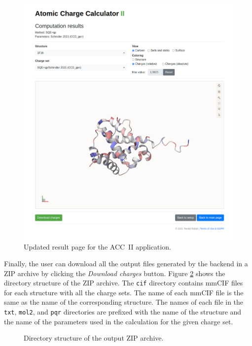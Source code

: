 \documentclass[
  digital,     %
  oneside,     %
  nosansbold,  %
  nocolorbold, %
  lof,         %
  lot,         %
]{fithesis4}
\begin{document}
\begin{figure}[htbp]
  \begin{center}
    \includegraphics[width=\textwidth]{figures/results-full.png}
  \end{center}
  \caption{Updated result page for the ACC~II application.}
  \label{fig:result_page}
\end{figure}

Finally, the user can download all the output files generated by the backend in a ZIP archive by clicking the \textit{Download charges} button. Figure \ref{fig:output_dir_structure} shows the directory structure of the ZIP archive. The \texttt{cif} directory contains mmCIF files for each structure with all the charge sets. The name of each mmCIF file is the same as the name of the corresponding structure. The names of each file in the \texttt{txt}, \texttt{mol2}, and \texttt{pqr} directories are prefixed with the name of the structure and the name of the parameters used in the calculation for the given charge set.

\noindent
\begin{figure}[h]
  \begin{minipage}[t]{10cm}
   \end{minipage}\hfill
\caption{Directory structure of the output ZIP archive.}
\label{fig:output_dir_structure}
\end{figure}
\end{document}
